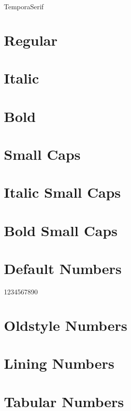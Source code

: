 \documentclass[a4paper]{article}
\begin{document}
\thispagestyle{empty}

\begin{center}\huge TemporaSerif
\end{center}


\section*{Regular}
\lipsum[1]

\section*{Italic}
\emph{\lipsum[2]}

\section*{Bold}
\textbf{\lipsum[1]}

\section*{Small Caps}
\textsc{\lipsum[1]}

\section*{Italic Small Caps}
\emph{\textsc{\lipsum[2]}}

\section*{Bold Small Caps}
\textsc{\textbf{\lipsum[1]}}

\section*{Default Numbers}

1234567890

\section*{Oldstyle Numbers}


\section*{Lining Numbers}


\section*{Tabular Numbers}
\end{document}
